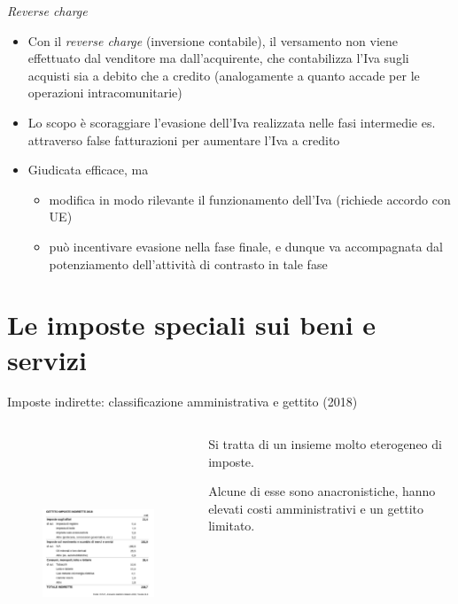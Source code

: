 \documentclass[aspectratio=64,11pt]{beamer}
\begin{document}
\begin{frame}{\emph{Reverse charge}}
\begin{itemize}
\item Con il \emph{reverse charge} (inversione contabile), il versamento non viene
effettuato dal venditore ma dall'acquirente, che contabilizza l'Iva sugli
acquisti sia a debito che a credito (analogamente a quanto accade per le
operazioni intracomunitarie)
\item Lo scopo è scoraggiare l'evasione dell'Iva realizzata nelle fasi intermedie
es. attraverso false fatturazioni per aumentare l'Iva a credito
\item Giudicata efficace, ma
\begin{itemize}
\item modifica in modo rilevante il funzionamento dell'Iva (richiede accordo con
UE)
\item può incentivare evasione nella fase finale, e dunque va accompagnata dal
potenziamento dell'attività di contrasto in tale fase
\end{itemize}
\end{itemize}
\end{frame}


\section{Le imposte speciali sui beni e servizi}


\begin{frame}{Imposte indirette: classificazione amministrativa e gettito (2018)}
  \begin{columns}
    \begin{column}{.7\columnwidth}
      \begin{figure}[htbp]
        \vspace*{-5mm}
        \includegraphics[height=7cm]{./figure/imposte-indirette-2018.png}
      \end{figure}
    \end{column}
    \begin{column}{.3\columnwidth}
      Si tratta di un insieme molto eterogeneo di imposte.
      \bigskip

      Alcune di esse sono anacronistiche, hanno elevati costi amministrativi e un
      gettito limitato.
    \end{column}
  \end{columns}
\end{frame}
\end{document}
